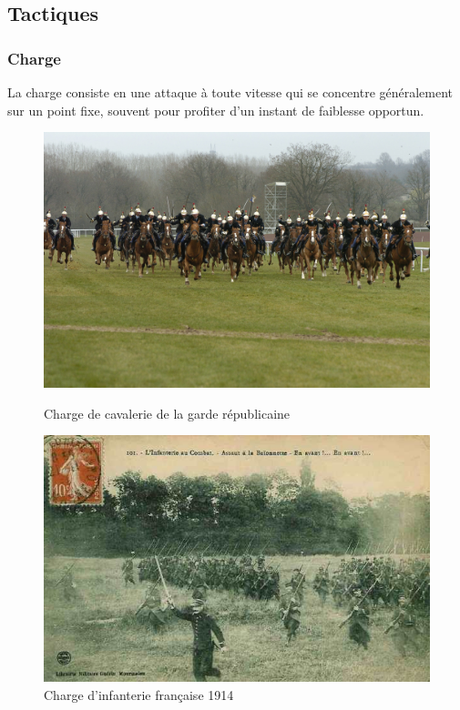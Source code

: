 \documentclass{article}
\begin{document}
\subsection{Tactiques}

\subsubsection{Charge}
La charge consiste en une attaque à toute vitesse qui se concentre généralement sur un point fixe, souvent pour profiter d'un instant de faiblesse opportun. 

\begin{center}
\begin{figure}[H]
\hfill
\begin{minipage}[H]{0.5\linewidth}
	\centering
	\includegraphics[width=\linewidth]{../ressources/Charge-de-cavalerie}
	\caption{Charge de cavalerie de la garde républicaine \cite{charge_cavalery}}
\end{minipage}
\hfill
\begin{minipage}[H]{0.45\linewidth}
	\centering
	\includegraphics[width=\linewidth]{../ressources/charge_infanterie}
	\caption{Charge d’infanterie française 1914 \cite{infantery_charge,charge_tactic}}
\end{minipage}
\hfill
\end{figure}
\end{center}
\end{document}
